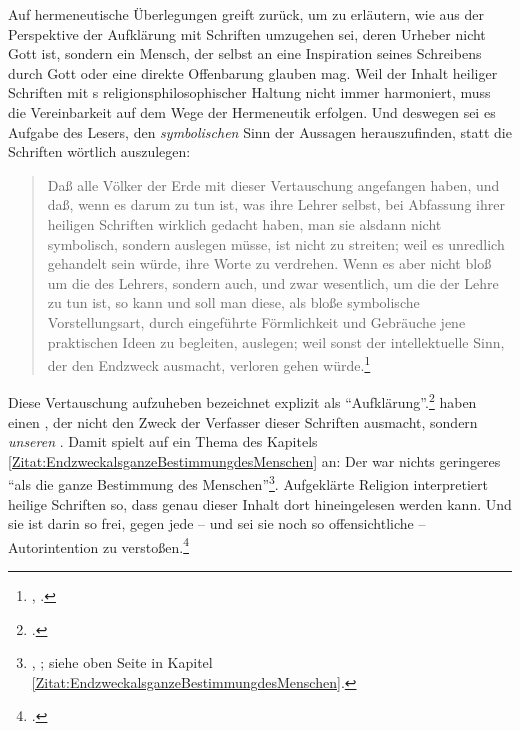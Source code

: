 Auf hermeneutische Überlegungen greift  zurück, um zu
erläutern, wie aus der Perspektive der Aufklärung mit Schriften umzugehen sei,
deren Urheber nicht Gott ist, sondern ein Mensch, der selbst an eine Inspiration
seines Schreibens durch Gott oder eine direkte Offenbarung glauben mag. Weil der
Inhalt heiliger Schriften mit s religionsphilosophischer
Haltung nicht immer harmoniert, muss die Vereinbarkeit auf dem Wege
der Hermeneutik erfolgen. Und deswegen sei es Aufgabe des Lesers, den
\emph{symbolischen} Sinn der Aussagen herauszufinden, statt die Schriften
wörtlich auszulegen:
\begin{quote}
  Daß alle Völker der Erde mit dieser Vertauschung angefangen haben, und daß,
  wenn es darum zu tun ist, was ihre Lehrer selbst, bei Abfassung ihrer heiligen
  Schriften wirklich gedacht haben, man sie alsdann nicht symbolisch, sondern
   auslegen müsse, ist nicht zu streiten; weil es unredlich
  gehandelt sein würde, ihre Worte zu verdrehen. Wenn es aber nicht bloß um die
   des Lehrers, sondern auch, und zwar wesentlich, um die
   der Lehre zu tun ist, so kann und soll man diese, als bloße
  symbolische Vorstellungsart, durch eingeführte Förmlichkeit und Gebräuche jene
  praktischen Ideen zu begleiten, auslegen; weil sonst der intellektuelle Sinn,
  der den Endzweck ausmacht, verloren gehen
  würde.\footnote{\cite[][BA~108]{Kant:AnthropologieinpragmatischerHinsicht1977},
  \cite[][VII: 192.7--17]{Kant:GesammelteWerke1900ff.}.}
\end{quote}
Diese Vertauschung aufzuheben bezeichnet  explizit als
\enquote{Aufklärung}.\footnote{\cite[Siehe][BA
107\,f.,]{Kant:AnthropologieinpragmatischerHinsicht1977} \cite[][VII:
191.36--192.5]{Kant:GesammelteWerke1900ff.}.} 
haben einen , der nicht den Zweck der
Verfasser dieser Schriften ausmacht, sondern \emph{unseren}
. Damit spielt  auf ein Thema des
Kapitels \ref{Zitat:EndzweckalsganzeBestimmungdesMenschen} an: Der
 war nichts geringeres \enquote{als die ganze Bestimmung
des Menschen}\footnote{\cite[][B 868]{Kant:KritikderreinenVernunft2003},
\cite[][III: 543.11]{Kant:GesammelteWerke1900ff.}; siehe oben Seite
\pageref{Zitat:EndzweckalsganzeBestimmungdesMenschen} in Kapitel
\ref{Zitat:EndzweckalsganzeBestimmungdesMenschen}.}. Aufgeklärte Religion
interpretiert heilige Schriften so, dass genau dieser Inhalt dort hineingelesen
werden kann. Und sie ist darin so frei, gegen jede -- und sei sie noch so
offensichtliche -- Autorintention zu
verstoßen.\footnote{\cite[Vgl.][134]{Doerflinger:UeberdenaufgeklaertenUmgangmitGottesWort2009}.}

